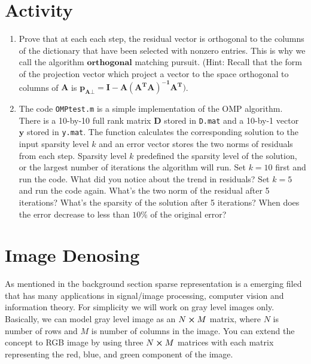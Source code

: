 \documentclass[12pt,letterpaper]{article}
\begin{document}
\section*{Activity}
\begin{enumerate} [1.]

\item
Prove that at each each step, the residual vector is orthogonal to the columns of the dictionary that have been selected with nonzero entries. This is why we call the algorithm $\bm{orthogonal}$ matching pursuit. (Hint: Recall that the form of the projection vector which project a vector to the space orthogonal to columns of $\bm{A}$ is 
$\bm{p_{A \bot} = I - A(A^TA)^{-1}A^T})$.

\item 
The code \texttt{OMPtest.m} is a simple implementation of the OMP algorithm. There is a 10-by-10 full rank matrix $\bm{D}$ stored in \texttt{D.mat} and a 10-by-1 vector $\bm{y}$ stored in \texttt{y.mat}. The function calculates the corresponding solution to the input sparsity level $k$ and an error vector stores the two norms of residuals from each step. Sparsity level $k$ predefined the sparsity level of the solution, or the largest number of iterations the algorithm will run. Set $k=10$ first and run the code. What did you notice about the trend in residuals? Set $k=5$ and run the code again. What's the two norm of the residual after 5 iterations? What's the sparsity of the solution after 5 iterations? When does the error decrease to less than $10\%$ of the original error?
\end{enumerate}

\pagebreak

\section*{Image Denosing}
As mentioned in the background section sparse representation is a emerging filed that has many applications in signal/image processing, computer vision and information theory. For simplicity we will work on gray level images only. Basically, we can model gray level image as an $N \cross M$ matrix, where $N$ is number of rows and $M$ is number of columns in the image. You can extend the concept to RGB image by using three $N \cross M$ matrices with each matrix representing the red, blue, and green component of the image.   
\end{document}
